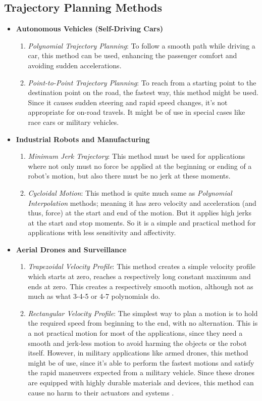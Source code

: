 \documentclass[conference]{IEEEtran}
\begin{document}
\subsection{Trajectory Planning Methods}
\begin{itemize}
    \item \textbf{Autonomous Vehicles (Self-Driving Cars)}
          \begin{enumerate}
              \item \textit{Polynomial Trajectory Planning}: To follow a smooth path while driving a car, this method can be used, enhancing the passenger comfort and avoiding sudden accelerations.
              \item \textit{Point-to-Point Trajectory Planning}: To reach from a starting point to the destination point on the road, the fastest way, this method might be used. Since it causes sudden steering and rapid speed changes, it's not appropriate for on-road travels. It might be of use in special cases like race cars or military vehicles.
          \end{enumerate}
    \item \textbf{Industrial Robots and Manufacturing}
          \begin{enumerate}
              \item \textit{Minimum Jerk Trajectory}: This method must be used for applications where not only must no force be applied at the beginning or ending of a robot's motion, but also there must be no jerk at these moments.
              \item \textit{Cycloidal Motion}: This method is quite much same as \textit{Polynomial Interpolation} methods; meaning it has zero velocity and acceleration (and thus, force) at the start and end of the motion. But it applies high jerks at the start and stop moments. So it is a simple and practical method for applications with less sensitivity and affectivity.
          \end{enumerate}
    \item \textbf{Aerial Drones and Surveillance}
          \begin{enumerate}
              \item \textit{Trapezoidal Velocity Profile}: This method creates a simple velocity profile which starts at zero, reaches a respectively long constant maximum and ends at zero. This creates a respectively smooth motion, although not as much as what 3-4-5 or 4-7 polynomials do.
              \item \textit{Rectangular Velocity Profile}: The simplest way to plan a motion is to hold the required speed from beginning to the end, with no alternation. This is a not practical motion for most of the applications, since they need a smooth and jerk-less motion to avoid harming the objects or the robot itself. However, in military applications like armed drones, this method might be of use, since it's able to perform the fastest motions and satisfy the rapid maneuvers expected from a military vehicle. Since these drones are equipped with highly durable materials and devices, this method can cause no harm to their actuators and systems \cite{b7}.
          \end{enumerate}
\end{itemize}
\end{document}
